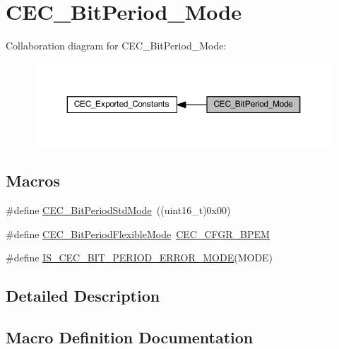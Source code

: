 \hypertarget{group___c_e_c___bit_period___mode}{}\section{C\+E\+C\+\_\+\+Bit\+Period\+\_\+\+Mode}
\label{group___c_e_c___bit_period___mode}
Collaboration diagram for C\+E\+C\+\_\+\+Bit\+Period\+\_\+\+Mode\+:
\nopagebreak
\begin{figure}[H]
\begin{center}
\leavevmode
\includegraphics[width=350pt]{group___c_e_c___bit_period___mode}
\end{center}
\end{figure}
\subsection*{Macros}
\begin{DoxyCompactItemize}
\item 
\#define \hyperlink{group___c_e_c___bit_period___mode_ga746ce0a831dfd76a47add310662c7f07}{C\+E\+C\+\_\+\+Bit\+Period\+Std\+Mode}~((uint16\+\_\+t)0x00)
\item 
\#define \hyperlink{group___c_e_c___bit_period___mode_ga5bf4c1b257b837770d4d59c93cca6902}{C\+E\+C\+\_\+\+Bit\+Period\+Flexible\+Mode}~\hyperlink{group___peripheral___registers___bits___definition_ga48c747693ec4dac8e4288ae4c0949def}{C\+E\+C\+\_\+\+C\+F\+G\+R\+\_\+\+B\+P\+EM}
\item 
\#define \hyperlink{group___c_e_c___bit_period___mode_ga3414347854a83bf70748624ec5b8dd49}{I\+S\+\_\+\+C\+E\+C\+\_\+\+B\+I\+T\+\_\+\+P\+E\+R\+I\+O\+D\+\_\+\+E\+R\+R\+O\+R\+\_\+\+M\+O\+DE}(M\+O\+DE)
\end{DoxyCompactItemize}


\subsection{Detailed Description}


\subsection{Macro Definition Documentation}
\mbox{\label{group___c_e_c___bit_period___mode_ga5bf4c1b257b837770d4d59c93cca6902}} 

